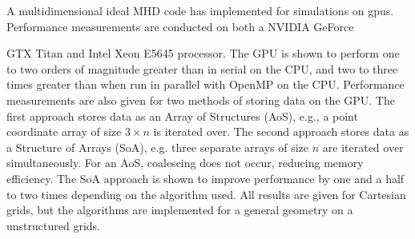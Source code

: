 \documentclass[11pt]{report}
\begin{document}
A multidimensional ideal MHD code has implemented for simulations on \glspl{gpu}.  Performance measurements are conducted on both a NVIDIA GeForce 


\abstractmultiplepage

GTX Titan and Intel Xeon E5645 processor. The GPU is shown to perform one to two orders of magnitude greater than in serial on the CPU, and two to three times greater than when run in parallel with OpenMP on the CPU.  Performance measurements are also given for two methods of storing data on the GPU.  The first approach stores data as an Array of Structures (AoS), e.g., a point coordinate array of size $3\times n$ is iterated over.  The second approach stores data as a Structure of Arrays (SoA), e.g. three separate arrays of size $n$ are iterated over simultaneously.  For an AoS, coalescing does not occur, reducing memory efficiency.  The SoA approach is shown to improve performance by one and a half to two times depending on the algorithm used.  All results are given for Cartesian grids, but the algorithms are implemented for a general geometry on a unstructured grids.

\startofchapters








\appendix
\appendixeqnumbering


\end{document}
